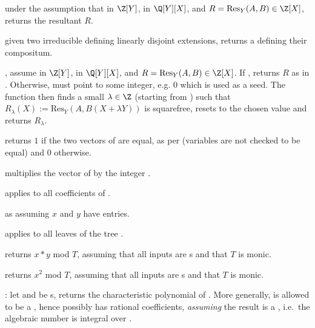 
under the assumption that  in $\Z[Y]$,  in $\Q[Y][X]$, and
$R = \text{Res}_Y(A, B) \in \Z[X]$, returns the resultant $R$.

 given two irreducible 
defining linearly disjoint extensions, returns a  defining their
compositum.

,
assume  in $\Z[Y]$,  in $\Q[Y][X]$, and $R =
\text{Res}_Y(A, B) \in \Z[X]$. If , returns $R$
as in . Otherwise,  must point to
some integer, e.g. $0$ which is used as a seed. The function then finds a
small $\lambda \in \Z$ (starting from ) such that
$R_\lambda(X) := \text{Res}_Y(A, B(X + \lambda Y))$ is squarefree, resets
 to the chosen value and returns $R_{\lambda}$.


 returns $1$ if the two vectors of 
are equal, as per  (variables are not checked to be equal) and
$0$ otherwise.

 multiplies the vector of  
by the integer .

 applies  to all
coefficients of .

 as  assuming $x$
and $y$ have  entries.


 applies  to all
leaves of the tree .


 returns $x*y$ mod $T$, assuming
that all inputs are s and that $T$ is monic.

 returns $x^2$ mod $T$, assuming
that all inputs are s and that $T$ is monic.

: let  and  be
s, returns the characteristic polynomial of .
More generally,  is allowed to be a , hence possibly has
rational coefficients, \emph{assuming} the result is a , i.e.~the
algebraic number  is integral over .

